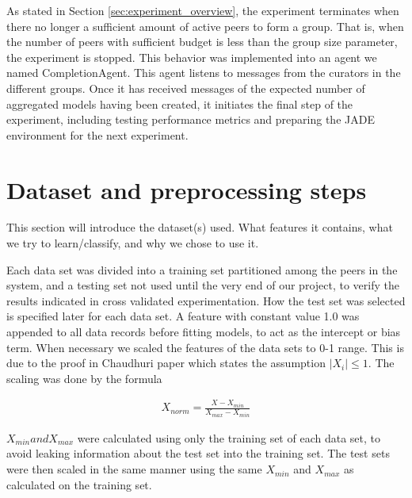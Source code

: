 As stated in Section \ref{sec:experiment_overview},  the experiment terminates when there no longer a sufficient amount of active peers to form a group. That is, when the number of peers with sufficient budget is less than the group size parameter, the experiment is stopped. This behavior was implemented into an agent we named CompletionAgent. This agent listens to messages from the curators in the different groups. Once it has received messages of the expected number of aggregated models having been created, it initiates the final step of the experiment, including testing performance metrics and preparing the JADE environment for the next experiment. 


\section{Dataset and preprocessing steps}
\label{sec:datasets}
This section will introduce the dataset(s) used. What features it contains, what we try to learn/classify, and why we chose to use it.

Each data set was divided into a training set partitioned among the peers in the system, and a testing set not used until the very end of our project, to verify the results indicated in cross validated experimentation. How the test set was selected is specified later for each data set.
A feature with constant value 1.0 was appended to all data records before fitting models, to act as the intercept or bias term. When necessary we scaled the features of the data sets to 0-1 range. This is due to the proof in Chaudhuri paper which states the assumption $|X_i|\leq 1$. The scaling was done by the formula

\begin{eqnarray}
X_{norm} = \frac{X-X_{min}}{X_{max} - X_{min}}
\end{eqnarray}

$X_{min} and X_{max}$ were calculated using only the training set of each data set, to avoid leaking information about the test set into the training set. The test sets were then scaled in the same manner using the same $X_{min}$ and $X_{max}$ as calculated on the training set.


